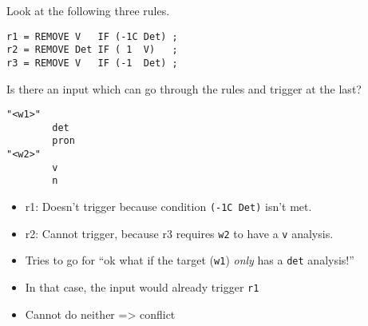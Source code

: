 Look at the following three rules.

\begin{verbatim}
r1 = REMOVE V   IF (-1C Det) ;
r2 = REMOVE Det IF ( 1  V)   ;
r3 = REMOVE V   IF (-1  Det) ;
\end{verbatim}

Is there an input which can go through the rules and trigger at the
last?

\begin{verbatim}
"<w1>"
        det
        pron
"<w2>"
        v
        n
\end{verbatim}

\begin{itemize}
\itemsep1pt\parskip0pt
\item
  r1: Doesn't trigger because condition \texttt{(-1C Det)} isn't met.
\item
  r2: Cannot trigger, because r3 requires \texttt{w2} to have a
  \texttt{v} analysis.
\item
  Tries to go for ``ok what if the target (\texttt{w1}) \emph{only} has
  a \texttt{det} analysis!''
\item
  In that case, the input would already trigger \texttt{r1}
\item
  Cannot do neither =\textgreater{} conflict
\end{itemize}

